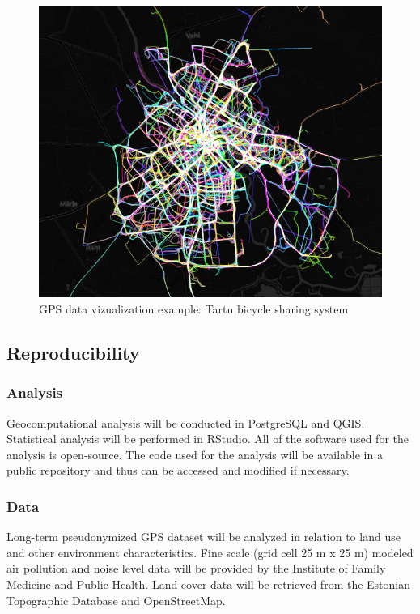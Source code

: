 \documentclass[]{article}
\begin{document}
\begin{figure}
\centering
\includegraphics{Tartu_bikes.png}
\caption{GPS data vizualization example: Tartu bicycle sharing system}
\end{figure}

\hypertarget{reproducibility}{%
\subsection{Reproducibility}\label{reproducibility}}

\hypertarget{analysis}{%
\subsubsection{Analysis}\label{analysis}}

Geocomputational analysis will be conducted in PostgreSQL and QGIS.
Statistical analysis will be performed in RStudio. All of the software
used for the analysis is open-source. The code used for the analysis
will be available in a public repository and thus can be accessed and
modified if necessary.

\hypertarget{data}{%
\subsubsection{Data}\label{data}}

Long-term pseudonymized GPS dataset will be analyzed in relation to land
use and other environment characteristics. Fine scale (grid cell 25 m x
25 m) modeled air pollution and noise level data will be provided by the
Institute of Family Medicine and Public Health. Land cover data will be
retrieved from the Estonian Topographic Database and OpenStreetMap.
\end{document}

